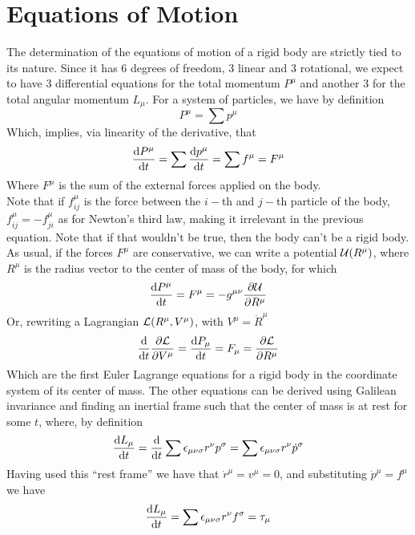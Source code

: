 \documentclass[../admech.tex]{subfiles}
\begin{document}
\section{Equations of Motion}
The determination of the equations of motion of a rigid body are strictly tied to its nature. Since it has $6$ degrees of freedom, 3 linear and 3 rotational, we expect to have 3 differential equations for the total momentum $P^\mu$ and another 3 for the total angular momentum $L_\mu$. For a system of particles, we have by definition
\begin{equation}
	P^\mu=\sum p^\mu
	\label{eq:totmomrigin}
\end{equation}
Which, implies, via linearity of the derivative, that
\begin{equation}
	\dv{P^\mu}{t}=\sum\dv{p^\mu}{t}=\sum f^\mu=F^\mu
	\label{eq:eqmrbody}
\end{equation}
Where $F^\mu$ is the sum of the external forces applied on the body.\\
Note that if $f_{ij}^\mu$ is the force between the $i-$th and $j-$th particle of the body, $f^\mu_{ij}=-f^\mu_{ji}$ as for Newton's third law, making it irrelevant in the previous equation. Note that if that wouldn't be true, then the body can't be a rigid body.\\
As usual, if the forces $F^\mu$ are conservative, we can write a potential $\mathcal{U}(R^\mu)$, where $R^\mu$ is the radius vector to the center of mass of the body, for which
\begin{equation*}
	\dv{P^\mu}{t}=F^\mu=-g^{\mu\nu}\pdv{\mathcal{U}}{R^\mu}
\end{equation*}
Or, rewriting a Lagrangian $\mathcal{L}(R^\mu,V^\mu)$, with $V^\mu=\dot{R}^\mu$
\begin{equation}
	\dv{t}\pdv{\mathcal{L}}{V^\mu}=\dv{P_\mu}{t}=F_\mu=\pdv{\mathcal{L}}{R^\mu}
	\label{eq:elrigbody}
\end{equation}
Which are the first Euler Lagrange equations for a rigid body in the coordinate system of its center of mass. The other equations can be derived using Galilean invariance and finding an inertial frame such that the center of mass is at rest for some $t$, where, by definition
\begin{equation*}
	\dv{L_\mu}{t}=\dv{t}\sum\epsilon_{\mu\nu\sigma}r^\nu p^\sigma=\sum\epsilon_{\mu\nu\sigma}r^\nu\dot{p}^\sigma
\end{equation*}
Having used this ``rest frame'' we have that $\dot{r}^\mu=v^\mu=0$, and substituting $\dot{p}^\mu=f^\mu$ we have
\begin{equation}
	\dv{L_\mu}{t}=\sum\epsilon_{\mu\nu\sigma}r^\nu f^\sigma=\tau_\mu
	\label{eq:torquerig}
\end{equation}
\end{document}
